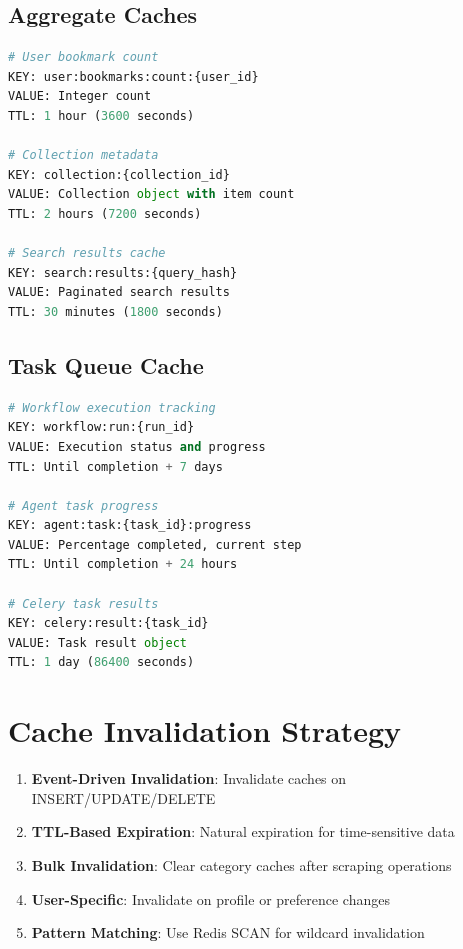 \documentclass[12pt,a4paper]{report}
\begin{document}
\subsection{Aggregate Caches}

\begin{lstlisting}[language=Python,basicstyle=\ttfamily\small]
# User bookmark count
KEY: user:bookmarks:count:{user_id}
VALUE: Integer count
TTL: 1 hour (3600 seconds)

# Collection metadata
KEY: collection:{collection_id}
VALUE: Collection object with item count
TTL: 2 hours (7200 seconds)

# Search results cache
KEY: search:results:{query_hash}
VALUE: Paginated search results
TTL: 30 minutes (1800 seconds)
\end{lstlisting}

\subsection{Task Queue Cache}

\begin{lstlisting}[language=Python,basicstyle=\ttfamily\small]
# Workflow execution tracking
KEY: workflow:run:{run_id}
VALUE: Execution status and progress
TTL: Until completion + 7 days

# Agent task progress
KEY: agent:task:{task_id}:progress
VALUE: Percentage completed, current step
TTL: Until completion + 24 hours

# Celery task results
KEY: celery:result:{task_id}
VALUE: Task result object
TTL: 1 day (86400 seconds)
\end{lstlisting}

\section{Cache Invalidation Strategy}

\begin{enumerate}
    \item \textbf{Event-Driven Invalidation}: Invalidate caches on INSERT/UPDATE/DELETE
    \item \textbf{TTL-Based Expiration}: Natural expiration for time-sensitive data
    \item \textbf{Bulk Invalidation}: Clear category caches after scraping operations
    \item \textbf{User-Specific}: Invalidate on profile or preference changes
    \item \textbf{Pattern Matching}: Use Redis SCAN for wildcard invalidation
\end{enumerate}
\end{document}
